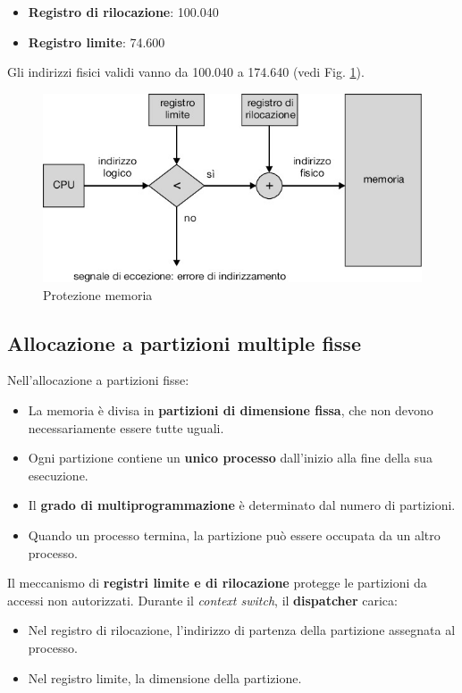 \begin{itemize}
    \item \textbf{Registro di rilocazione}: 100.040
    \item \textbf{Registro limite}: 74.600
\end{itemize}

Gli indirizzi fisici validi vanno da 100.040 a 174.640 (vedi Fig. \ref{fig:9.6}).
\begin{figure}[h]
    \centering
    \includegraphics[width=0.5\linewidth]{images/protez_meme.png}
    \caption{Protezione memoria}
    \label{fig:9.6}
\end{figure}

\subsection{Allocazione a partizioni multiple fisse}
Nell'allocazione a partizioni fisse:
\begin{itemize}
    \item La memoria è divisa in \textbf{partizioni di dimensione fissa}, che non devono necessariamente essere tutte uguali.
    \item Ogni partizione contiene un \textbf{unico processo} dall'inizio alla fine della sua esecuzione.
    \item Il \textbf{grado di multiprogrammazione} è determinato dal numero di partizioni.
    \item Quando un processo termina, la partizione può essere occupata da un altro processo.
\end{itemize}

Il meccanismo di \textbf{registri limite e di rilocazione} protegge le partizioni da accessi non autorizzati. Durante il \textit{context switch}, il \textbf{dispatcher} carica:
\begin{itemize}
    \item Nel registro di rilocazione, l'indirizzo di partenza della partizione assegnata al processo.
    \item Nel registro limite, la dimensione della partizione.
\end{itemize}

